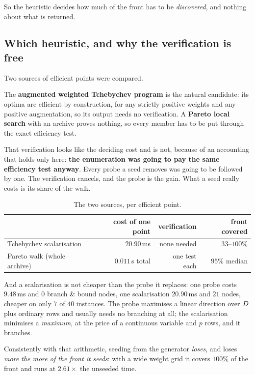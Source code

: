 \documentclass[11pt,a4paper]{article}
\begin{document}
\noindent
So the heuristic decides how much of the front has to be \emph{discovered}, and
nothing about what is returned.

\subsection{Which heuristic, and why the verification is free}

Two sources of efficient points were compared.

The \textbf{augmented weighted Tchebychev program} is the natural candidate:
its optima are efficient by construction, for any strictly positive weights and
any positive augmentation, so its output needs no verification.  A
\textbf{Pareto local search} with an archive proves nothing, so every member
has to be put through the exact efficiency test.

That verification looks like the deciding cost and is not, because of an
accounting that holds only here: \textbf{the enumeration was going to pay the
same efficiency test anyway}.  Every probe a seed removes was going to be
followed by one.  The verification cancels, and the probe is the gain.  What a
seed really costs is its share of the walk.

\begin{table}[h]
\centering
\caption{The two sources, per efficient point.}
\label{tab:sources}
\begin{tabular}{lrrr}
\toprule
 & cost of one point & verification & front covered \\
\midrule
Tchebychev scalarisation & $20.90$\,ms & none needed & $33$--$100\%$ \\
Pareto walk (whole archive) & $0.011$\,s total & one test each & $95\%$ median \\
\bottomrule
\end{tabular}
\end{table}

\noindent
And a scalarisation is not cheaper than the probe it replaces: one probe costs
$9.48$\,ms and $0$ branch \& bound nodes, one scalarisation $20.90$\,ms and
$21$ nodes, cheaper on only $7$ of $40$ instances.  The probe maximises a
linear direction over $D$ plus ordinary rows and usually needs no branching
at all; the scalarisation minimises a \emph{maximum}, at the price of a
continuous variable and $p$ rows, and it branches.

Consistently with that arithmetic, seeding from the generator \emph{loses}, and
loses \emph{more the more of the front it seeds}: with a wide weight grid it
covers $100\%$ of the front and runs at $2.61\times$ the unseeded time.
\end{document}

